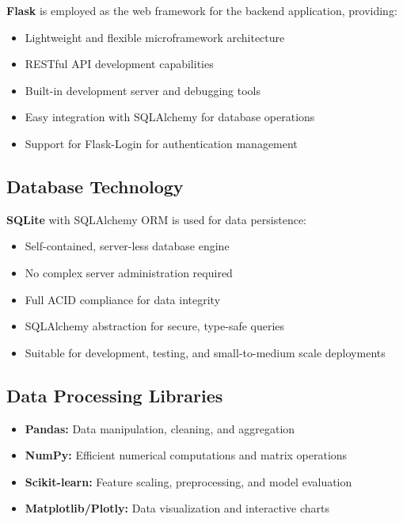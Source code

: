 \documentclass[12pt,a4paper,twoside]{report}
\begin{document}
\textbf{Flask} is employed as the web framework for the backend application, providing:

\begin{itemize}
    \item Lightweight and flexible microframework architecture
    \item RESTful API development capabilities
    \item Built-in development server and debugging tools
    \item Easy integration with SQLAlchemy for database operations
    \item Support for Flask-Login for authentication management
\end{itemize}

\subsection*{Database Technology}

\textbf{SQLite} with SQLAlchemy ORM is used for data persistence:

\begin{itemize}
    \item Self-contained, server-less database engine
    \item No complex server administration required
    \item Full ACID compliance for data integrity
    \item SQLAlchemy abstraction for secure, type-safe queries
    \item Suitable for development, testing, and small-to-medium scale deployments
\end{itemize}

\subsection*{Data Processing Libraries}

\begin{itemize}
    \item \textbf{Pandas:} Data manipulation, cleaning, and aggregation
    \item \textbf{NumPy:} Efficient numerical computations and matrix operations
    \item \textbf{Scikit-learn:} Feature scaling, preprocessing, and model evaluation
    \item \textbf{Matplotlib/Plotly:} Data visualization and interactive charts
\end{itemize}
\end{document}
